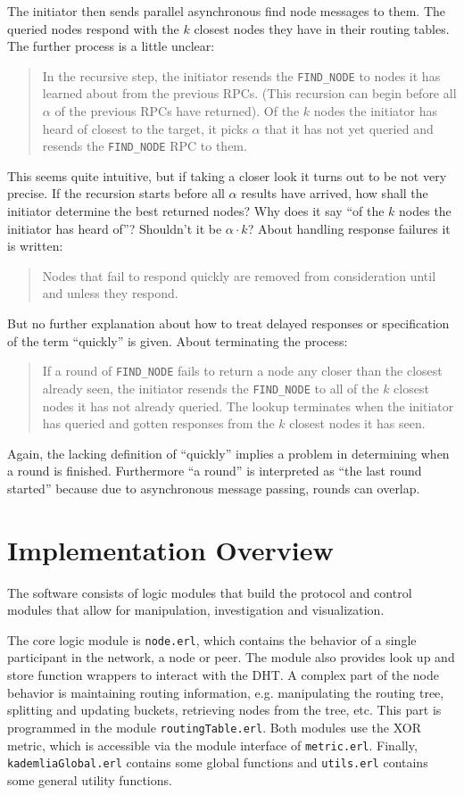 \documentclass[a4paper,10pt,notitlepage]{article}
\begin{document}
The initiator then sends parallel asynchronous find node messages to them.
The queried nodes respond with the $k$ closest nodes they have in their routing tables.
The further process is a little unclear:
\begin{quote}
	In the recursive step, the initiator resends the \texttt{FIND\_NODE} to nodes it has learned about from the previous 		RPCs. (This recursion can begin before all $\alpha$ of the previous RPCs have returned).
	Of the $k$ nodes the initiator has heard of closest to the target, it picks $\alpha$ that it has not yet queried and 		resends the \texttt{FIND\_NODE} RPC to them.
\end{quote}
This seems quite intuitive, but if taking a closer look it turns out to be not very precise.
If the recursion starts before all $\alpha$ results have arrived, how shall the initiator determine the best returned nodes?
Why does it say ``of the $k$ nodes the initiator has heard of''? Shouldn't it be $\alpha \cdot k$?
About handling response failures it is written:
\begin{quote}
	Nodes that fail to respond quickly are removed from consideration until and unless they respond.
\end{quote}
But no further explanation about how to treat delayed responses or specification of the term ``quickly'' is given.
About terminating the process:
\begin{quote}
	If a round of \texttt{FIND\_NODE} fails to return a node any closer than the closest already seen, the initiator resends 	the \texttt{FIND\_NODE} to all of the $k$ closest nodes it has not already queried. 
	The lookup terminates when the initiator has queried and gotten responses from the $k$ closest nodes it has seen.
\end{quote}
Again, the lacking definition of ``quickly'' implies a problem in determining when a round is finished.
Furthermore ``a round''  is interpreted as ``the last round started'' because due to asynchronous message passing, rounds can overlap.

\section{Implementation Overview}

The software consists of logic modules that build the protocol and control modules that allow for manipulation, investigation and visualization.

The core logic module is \texttt{node.erl}, which contains the behavior of a single participant in the network, a node or peer.
The module also provides look up and store function wrappers to interact with the DHT.
A complex part of the node behavior is maintaining routing information, e.g. manipulating the routing tree, splitting and updating buckets, retrieving nodes from the tree, etc.
This part is programmed in the module \texttt{routingTable.erl}.
Both modules use the XOR metric, which is accessible via the module interface of \texttt{metric.erl}.
Finally, \texttt{kademliaGlobal.erl} contains some global functions and \texttt{utils.erl} contains some general utility functions.
\end{document}
